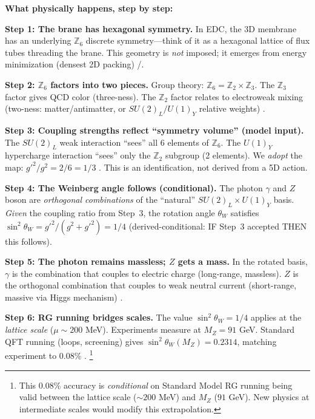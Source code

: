 \begin{tcolorbox}[colback=green!5!white, colframe=green!50!black,
    title=\textbf{Physical Process Narrative: Electroweak Mixing in One Movie}]
\textbf{What physically happens, step by step:}

\textbf{Step 1: The brane has hexagonal symmetry.}
In EDC, the 3D membrane has an underlying $\mathbb{Z}_6$ discrete symmetry---think of
it as a hexagonal lattice of flux tubes threading the brane. This geometry is
\emph{not} imposed; it emerges from energy minimization (densest 2D packing) \tagDc{}/\tagP{}.

\textbf{Step 2: $\mathbb{Z}_6$ factors into two pieces.}
Group theory: $\mathbb{Z}_6 = \mathbb{Z}_2 \times \mathbb{Z}_3$. The $\mathbb{Z}_3$
factor gives QCD color (three-ness). The $\mathbb{Z}_2$ factor relates to electroweak
mixing (two-ness: matter/antimatter, or $SU(2)_L/U(1)_Y$ relative weights) \tagI{}.

\textbf{Step 3: Coupling strengths reflect ``symmetry volume'' (model input).}
The $SU(2)_L$ weak interaction ``sees'' all 6 elements of $\mathbb{Z}_6$.
The $U(1)_Y$ hypercharge interaction ``sees'' only the $\mathbb{Z}_2$ subgroup (2 elements).
We \emph{adopt} the map: $g'^2/g^2 = 2/6 = 1/3$ \tagP{}. This is an identification,
not derived from a 5D action.

\textbf{Step 4: The Weinberg angle follows (conditional).}
The photon $\gamma$ and $Z$ boson are \emph{orthogonal combinations} of the
``natural'' $SU(2)_L \times U(1)_Y$ basis. \emph{Given} the coupling ratio from Step~3,
the rotation angle $\theta_W$ satisfies $\sin^2\theta_W = g'^2/(g^2 + g'^2) = 1/4$
\tagDc{} (derived-conditional: IF Step~3 accepted THEN this follows).

\textbf{Step 5: The photon remains massless; $Z$ gets a mass.}
In the rotated basis, $\gamma$ is the combination that couples to electric charge
(long-range, massless). $Z$ is the orthogonal combination that couples to weak
neutral current (short-range, massive via Higgs mechanism) \tagBL{}.

\textbf{Step 6: RG running bridges scales.}
The value $\sin^2\theta_W = 1/4$ applies at the \emph{lattice scale} ($\mu \sim 200$ MeV).
Experiments measure at $M_Z = 91$ GeV. Standard QFT running (loops, screening)
gives $\sin^2\theta_W(M_Z) = 0.2314$, matching experiment to 0.08\% \tagBL{}.%
\footnote{This 0.08\% accuracy is \emph{conditional} on Standard Model RG running being valid between the lattice scale ($\sim 200$ MeV) and $M_Z$ ($91$ GeV). New physics at intermediate scales would modify this extrapolation.}


\end{tcolorbox}

